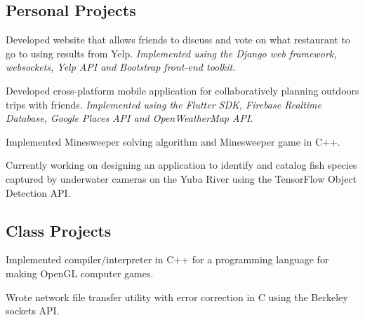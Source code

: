 \documentclass[letterpaper]{article}
\renewenvironment{itemize}{
  \begin{list}{}{
    \setlength{\leftmargin}{1.5em}
  }
}{
  \end{list}
}
\begin{document}
\subsection*{Personal Projects}
\begin{itemize}
    \item[$\bullet$] Developed website that allows friends to discuss and vote on what restaurant to go to using results from Yelp. \emph{Implemented using the Django web framework, websockets, Yelp API and Bootstrap front-end toolkit.}
    \item[$\bullet$] Developed cross-platform mobile application for collaboratively planning outdoors trips with friends. \emph{Implemented using the Flutter SDK, Firebase Realtime Database, Google Places API and OpenWeatherMap API.}
    \item[$\bullet$] Implemented Minesweeper solving algorithm and Minesweeper game in C++.
    \item[$\bullet$] Currently working on designing an application to identify and catalog fish species captured by underwater cameras on the Yuba River using the TensorFlow Object Detection API.
\end{itemize}
\subsection*{Class Projects}
\begin{itemize}
    \item[$\bullet$] Implemented compiler/interpreter in C++ for a programming language for making OpenGL computer games.
    \item[$\bullet$] Wrote network file transfer utility with error correction in C using the Berkeley sockets API.
\end{itemize}

\vspace{0.2in}
\end{document}
